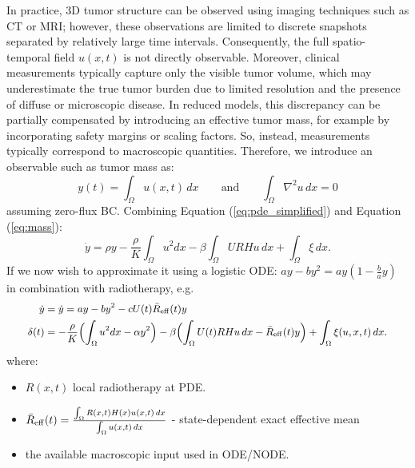In practice, 3D tumor structure can be observed using imaging techniques
such as CT or MRI; however, these observations are limited to discrete
snapshots separated by relatively large time intervals. Consequently,
the full spatio-temporal field \(u(x,t)\) is not directly observable.
Moreover, clinical measurements typically capture only the visible tumor
volume, which may underestimate the true tumor burden due to limited
resolution and the presence of diffuse or microscopic disease. In
reduced models, this discrepancy can be partially compensated by
introducing an effective tumor mass, for example by incorporating safety
margins or scaling factors. So, instead, measurements typically
correspond to macroscopic quantities. Therefore, we introduce an
observable such as tumor mass as:
\begin{equation}
\label{eq:mass}
y(t)
=
\int_{\Omega} u(x,t)\,dx
\qquad \text{and} \qquad
\int_{\Omega} \nabla^{2}u\,dx = 0
\end{equation}
assuming zero-flux BC. Combining Equation (\ref{eq:pde_simplified}) and  Equation (\ref{eq:mass}):
\begin{equation}
\dot y=
\rho y
-\frac{\rho}{K}\int_\Omega u^2dx
-\beta\int_\Omega URHu\,dx
+\int_\Omega \xi\,dx .
\end{equation}
If we now wish to approximate it using a logistic ODE:
\(ay - by^{2} = ay(1 - \frac{b}{a}y)\) in combination with radiotherapy,
e.g.
\begin{equation}
\small
\begin{aligned}
\dot y
&=
\dot y = ay - by^2 - cU(t)\bar R_{\mathrm{eff}}(t)y
\\
\delta(t)
&=
-\frac{\rho}{K}
\Bigl(\int_\Omega u^2dx-\alpha y^2\Bigr)
-\beta
\Bigl(
\int_\Omega U(t)RHu\,dx
-\bar R_{\mathrm{eff}}(t)y
\Bigr)
+\int_\Omega \xi(u,x,t)\,dx .
\end{aligned}
\end{equation}
where:
\begin{itemize}
    \item $R(x,t)$ local radiotherapy at PDE.

    \item $\bar R_{\mathrm{eff}}(t) = \frac{\int_{\Omega}^{}{R(x,t)H(x)u(x,t)\text{\,}dx}}{\int_{\Omega}^{}{u(x,t)\text{\,}dx}}$ - state-dependent exact effective mean

    \item the available macroscopic input used in ODE/NODE.
    
\end{itemize}

